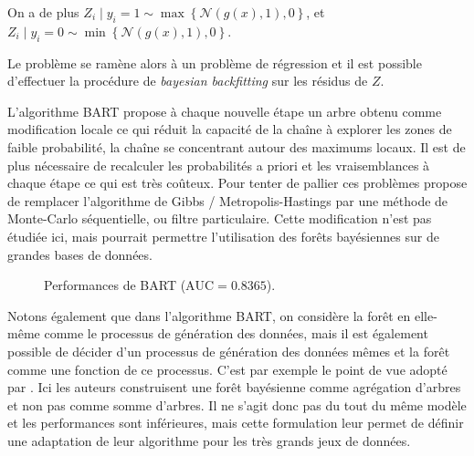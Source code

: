 On a de plus $Z_i \mid y_i = 1 \sim \max \left\{ \mathcal{N} ( g(x) , 1 ) , 0 \right\}$, et $Z_i \mid y_i = 0 \sim \min \left\{ \mathcal{N} ( g(x) , 1 ) , 0 \right\}$.

Le problème se ramène alors à un problème de régression et il est possible d'effectuer la procédure de \emph{bayesian backfitting} sur les résidus de $Z$.

L'algorithme BART propose à chaque nouvelle étape un arbre obtenu comme modification locale ce qui réduit la capacité de la chaîne à explorer les zones de faible probabilité, la chaîne se concentrant autour des maximums locaux. Il est de plus nécessaire de recalculer les probabilités a priori et les vraisemblances à chaque étape ce qui est très coûteux. Pour tenter de pallier ces problèmes \citet{Lakshminarayanan2015} propose de remplacer l'algorithme de Gibbs / Metropolis-Hastings par une méthode de Monte-Carlo séquentielle, ou filtre particulaire. Cette modification n'est pas étudiée ici, mais pourrait permettre l'utilisation des forêts bayésiennes sur de grandes bases de données.

\begin{figure}[htbp]
    \caption{Performances de BART ($\mathrm{AUC} = 0.8365$).}
\end{figure}

Notons également que dans l'algorithme BART, on considère la forêt en elle-même comme le processus de génération des données, mais il est également possible de décider d'un processus de génération des données mêmes et la forêt comme une fonction de ce processus. C'est par exemple le point de vue adopté par \citet{Taddy2015}. Ici les auteurs construisent une forêt bayésienne  comme agrégation d'arbres et non pas comme somme d'arbres. Il ne s'agit donc pas du tout du même modèle et les performances sont inférieures, mais cette formulation leur permet de définir une adaptation de leur algorithme pour les très grands jeux de données.

